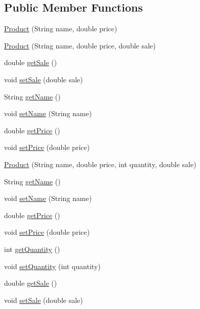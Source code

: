 \subsection*{Public Member Functions}
\begin{DoxyCompactItemize}
\item 
\mbox{\hyperlink{class_s_p_q_1_1data_1_1_product_ac5b9fd5a8d446b4d5354f4d35fbd0384}{Product}} (String name, double price)
\item 
\mbox{\hyperlink{class_s_p_q_1_1data_1_1_product_aeb77e341c092434872d42248d1c3af7d}{Product}} (String name, double price, double sale)
\item 
double \mbox{\hyperlink{class_s_p_q_1_1data_1_1_product_a07ba2dea61bb96215609776cc4d7058d}{get\+Sale}} ()
\item 
void \mbox{\hyperlink{class_s_p_q_1_1data_1_1_product_ab7714f5e5a6f1b0a293ad7140c351c3c}{set\+Sale}} (double sale)
\item 
String \mbox{\hyperlink{class_s_p_q_1_1data_1_1_product_a03b62c19f01f4c231b742de9eba2ed25}{get\+Name}} ()
\item 
void \mbox{\hyperlink{class_s_p_q_1_1data_1_1_product_a257a5e290694db0588a9ac9aad598360}{set\+Name}} (String name)
\item 
double \mbox{\hyperlink{class_s_p_q_1_1data_1_1_product_ad8200addd74d2e3b6ea9cfff4e8b8c7e}{get\+Price}} ()
\item 
void \mbox{\hyperlink{class_s_p_q_1_1data_1_1_product_a6a12ed828fa7745b6bc8f5f2bc5dd014}{set\+Price}} (double price)
\item 
\mbox{\hyperlink{class_s_p_q_1_1data_1_1_product_ada78ea5ee9ea14b1c94e930603e449cb}{Product}} (String name, double price, int quantity, double sale)
\item 
String \mbox{\hyperlink{class_s_p_q_1_1data_1_1_product_a03b62c19f01f4c231b742de9eba2ed25}{get\+Name}} ()
\item 
void \mbox{\hyperlink{class_s_p_q_1_1data_1_1_product_a257a5e290694db0588a9ac9aad598360}{set\+Name}} (String name)
\item 
double \mbox{\hyperlink{class_s_p_q_1_1data_1_1_product_ad8200addd74d2e3b6ea9cfff4e8b8c7e}{get\+Price}} ()
\item 
void \mbox{\hyperlink{class_s_p_q_1_1data_1_1_product_a6a12ed828fa7745b6bc8f5f2bc5dd014}{set\+Price}} (double price)
\item 
int \mbox{\hyperlink{class_s_p_q_1_1data_1_1_product_a1bcbc2a00b31563677cea1ab4cb8095c}{get\+Quantity}} ()
\item 
void \mbox{\hyperlink{class_s_p_q_1_1data_1_1_product_a057c7298cb6575a0d709f3fe2bf73ea7}{set\+Quantity}} (int quantity)
\item 
double \mbox{\hyperlink{class_s_p_q_1_1data_1_1_product_a07ba2dea61bb96215609776cc4d7058d}{get\+Sale}} ()
\item 
void \mbox{\hyperlink{class_s_p_q_1_1data_1_1_product_ab7714f5e5a6f1b0a293ad7140c351c3c}{set\+Sale}} (double sale)
\end{DoxyCompactItemize}


